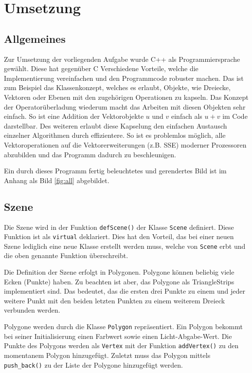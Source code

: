 \documentclass[final,a4paper,11pt,notitlepage,halfparskip]{scrreprt}
\begin{document}
\chapter{Umsetzung}
\section{Allgemeines}
Zur Umsetzung der vorliegenden Aufgabe wurde C++ als Programmiersprache gewählt.
Diese hat gegenüber C Verschiedene Vorteile, welche die Implementierung
vereinfachen und den Programmcode robuster machen. Das ist zum Beispiel das
Klassenkonzept, welches es erlaubt, Objekte, wie Dreiecke, Vektoren oder Ebenen
mit den zugehörigen Operationen zu kapseln. Das Konzept der Operatorüberladung
wiederum macht das Arbeiten mit diesen Objekten sehr einfach. So ist eine
Addition der Vektorobjekte $u$ und $v$ einfach als $u + v$ im Code darstellbar.
Des weiteren erlaubt diese Kapselung den einfachen Austausch einzelner
Algorithmen durch effizientere. So ist es problemlos möglich, alle
Vektoroperationen auf die Vektorerweiterungen (z.B. SSE) moderner Prozessoren 
abzubilden und das Programm dadurch zu beschleunigen.

Ein durch dieses Programm fertig beleuchtetes und gerendertes Bild ist im Anhang
als Bild \ref{fig:all} abgebildet.

\section{Szene}
Die Szene wird in der Funktion \texttt{defScene()} der Klasse \texttt{Scene}
definiert. Diese Funktion ist als \texttt{virtual} deklariert. Dies hat den Vorteil, das
bei einer neuen Szene lediglich eine neue Klasse erstellt werden muss, welche
von \texttt{Scene} erbt und die oben genannte Funktion überschreibt.

Die Definition der Szene erfolgt in Polygonen. Polygone können beliebig viele
Ecken (Punkte) haben. Zu beachten ist aber, das Polygone als TriangleStrips implementiert
sind. Das bedeutet, das die ersten drei Punkte zu einem und jeder weitere Punkt 
mit den beiden letzten Punkten zu einem weiterem Dreieck verbunden werden.

Polygone werden durch die Klasse \texttt{Polygon} repräsentiert. Ein Polygon
bekommt bei seiner Initialisierung einen Farbwert sowie einen Licht-Abgabe-Wert.
Die Punkte des Polygons werden als \texttt{Vertex} mit der Funktion
\texttt{addVertex()} zu den momentanem Polygon hinzugefügt. Zuletzt muss das
Polygon mittels \texttt{push\_back()} zu der Liste der Polygone hinzugefügt
werden.
\end{document}
